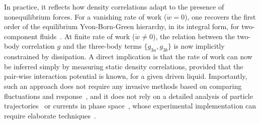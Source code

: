 \documentclass[superscriptaddress, twocolumn, prx, longbibliography, nofootinbib]{revtex4-1}
\begin{document}
In practice, it reflects how density correlations adapt to the presence of nonequilibrium forces. For a vanishing rate of work ($\dot w = 0$), one recovers the first order of the equilibrium Yvon-Born-Green hierarchy, in its integral form, for two-component fluids~\cite{Hansen2013}. At finite rate of work ($\dot w\neq0$), the relation between the two-body correlation $g$ and the three-body terms $\{g_{3a},g_{3b}\}$ is now implicitly constrained by dissipation. A direct implication is that the rate of work can now be inferred simply by measuring static density correlations, provided that the pair-wise interaction potential is known, for a given driven liquid. Importantly, such an approach does not require any invasive methods based on comparing fluctuations and response~\cite{Harada2005, Mizuno2007, Visco2015, Turlier2016, Ahmed2018}, and it does not rely on a detailed analysis of particle trajectories~\cite{Roldan2018, Parrondo2018} or currents in phase space~\cite{Gingrich2017, Li2018}, whose experimental implementation can require elaborate techniques~\cite{Battle604, Mura2018}.
\end{document}
